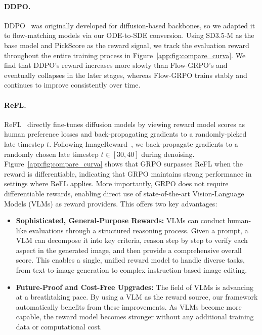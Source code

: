 
\paragraph{DDPO.} 
DDPO~\cite{ddpo} was originally developed for diffusion-based backbones, so we adapted it to flow-matching models via our ODE-to-SDE conversion. Using SD3.5-M as the base model and PickScore as the reward signal, we track the evaluation reward throughout the entire training process in Figure~\ref{app:fig:compare_curva}. We find that DDPO’s reward increases more slowly than Flow-GRPO’s and eventually collapses in the later stages, whereas Flow-GRPO trains stably and continues to improve consistently over time.

\paragraph{ReFL.}
ReFL~\cite{xu2024imagereward} directly fine-tunes diffusion models by viewing reward model scores as human preference losses and back-propagating gradients to a randomly-picked late timestep $t$.
Following ImageReward~\cite{xu2024imagereward}, we back-propagate gradients to a randomly chosen late timestep $t \in [30, 40]$ during denoising. Figure~\ref{app:fig:compare_curva} shows that GRPO surpasses ReFL when the reward is differentiable, indicating that GRPO maintains strong performance in settings where ReFL applies. More importantly, GRPO does not require differentiable rewards, enabling direct use of state-of-the-art Vision-Language Models (VLMs) as reward providers. This offers two key advantages:

\begin{itemize}[leftmargin=10pt]
\item \textbf{Sophisticated, General-Purpose Rewards:} VLMs can conduct human-like evaluations through a structured reasoning process. Given a prompt, a VLM can decompose it into key criteria, reason step by step to verify each aspect in the generated image, and then provide a comprehensive overall score. This enables a single, unified reward model to handle diverse tasks, from text-to-image generation to complex instruction-based image editing.

\item \textbf{Future-Proof and Cost-Free Upgrades:} The field of VLMs is advancing at a breathtaking pace. By using a VLM as the reward source, our framework automatically benefits from these improvements. As VLMs become more capable, the reward model becomes stronger without any additional training data or computational cost.
\end{itemize}


